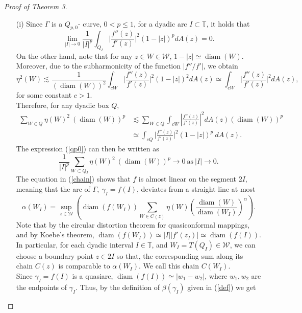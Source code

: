 \documentclass[12pt,a4paper]{article}
\theoremstyle{definition}
\theoremstyle{remark}
\newcommand{\T}{\mathbb{T}}
\newcommand{\diam}{\operatorname{diam}}
\numberwithin{komcounter}{section}
\begin{document}
\begin{proof}[Proof of Theorem 3]
\indent	
	\begin{itemize}
\item[(i)]Since $\Gamma$ is a $Q_{p,0}$- curve, $0<p\leq1$, for a dyadic arc $I\subset\T$, it holds that
\begin{equation}\label{qp0}
		 \lim_{|I|\to 0}\frac{1}{|I|^p}\int_{Q_I}\bigg\vert\frac{f''(z)}{f'(z)}\bigg\vert^2 (1-|z|)^p dA(z)= 0.
		 \end{equation}
On the other hand, note that for any $z\in W\in\mathcal{W}$,  $1-|z|\simeq \diam (W)$. Moreover, due to the subharmonicity of the function $|f''/f'|$, we obtain 
$$
\eta^2(W) \lesssim  \frac{1}{(\diam( W))^2}  \int_{cW}\bigg\vert\frac{f''(z)}{f'(z)}\bigg\vert^2 (1-|z|)^2dA(z)\simeq \int_{cW}\bigg\vert\frac{f''(z)}{f'(z)}\bigg\vert^2 dA(z),
$$
for some constant $c>1$.\\ 
	Therefore, for any dyadic box $Q$, 
\begin {align}\nonumber
  \sum_{W\in  Q} \eta(W)^2 ~(\diam( W))^p &\lesssim  \sum_{W\in  Q}
    \int_{cW}\left\vert\frac{f''(z)}{f'(z)}\right\vert^2 dA(z) (\diam (W))^p\\\nonumber&\simeq 
 \int_{cQ} \bigg\vert\frac{f''(z)}{f'(z)}\bigg\vert^2 (1-|z|)^p  ~dA(z).
\end{align}
The expression (\ref{qp0}) can then be written as
	\begin{equation}\label{v}
	\frac{1}{|I|^p}	\sum_{W\subset  Q_I} \eta(W)^2 ~(\diam(W))^p \to 0~ \textrm{as} ~|I|\to 0.
	\end{equation}
The equation in (\ref{chain}) shows that $f$ is almost linear on the segment $2I$, meaning that the arc of $\Gamma, ~ \gamma_I= f(I)$, deviates from a straight line at most $$\alpha(W_I)=\sup_{z\in 2I}  \left(\diam( f (W_I)) \sum_{W\in C(z) } \eta(W) \left(\frac{\diam(W)}{\diam (W_I)}\right)^\alpha\right).$$ 
Note that by the circular distortion theorem for quasiconformal mappings, and by  Koebe's theorem, $\diam(f(W_I)) \simeq |I| |f'(z_I) | \simeq \diam (f(I))$.\\
In particular, for each dyadic interval $I\in \T$, and  $W_I = T(Q_I ) \in \mathcal{W}$, we can choose a
boundary point $z \in 2I$  so that, the
corresponding sum along its chain $C(z)$ is comparable to $\alpha (W_I)$. We  call this chain $C(W_I)$. \\
Since $\gamma_I=f(I)$ is a quasiarc, $\diam(f(I)) \simeq |w_1-w_2|$, where $w_1, w_2$ are the endpoints of $\gamma_I$. Thus, by the definition of $\beta (\gamma_I)$ given in (\ref{def}) we get

\end{itemize}
\end{proof}
\end{document}
